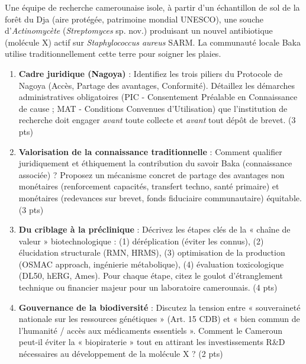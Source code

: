 \documentclass[11pt]{article}
\begin{document}
\begin{exercice}
Une équipe de recherche camerounaise isole, à partir d'un échantillon de sol de la forêt du Dja (aire protégée, patrimoine mondial UNESCO), une souche d'\textit{Actinomycète} (\textit{Streptomyces} sp. nov.) produisant un nouvel antibiotique (molécule X) actif sur \textit{Staphylococcus aureus} SARM. La communauté locale Baka utilise traditionnellement cette terre pour soigner les plaies.

\begin{enumerate}
    \item \textbf{Cadre juridique (Nagoya)} : Identifiez les trois piliers du Protocole de Nagoya (Accès, Partage des avantages, Conformité). Détaillez les démarches administratives obligatoires (PIC - Consentement Préalable en Connaissance de cause ; MAT - Conditions Convenues d'Utilisation) que l'institution de recherche doit engager \textit{avant} toute collecte et \textit{avant} tout dépôt de brevet. (3 pts)
    \item \textbf{Valorisation de la connaissance traditionnelle} : Comment qualifier juridiquement et éthiquement la contribution du savoir Baka (connaissance associée) ? Proposez un mécanisme concret de partage des avantages non monétaires (renforcement capacités, transfert techno, santé primaire) et monétaires (redevances sur brevet, fonds fiduciaire communautaire) équitable. (3 pts)
    \item \textbf{Du criblage à la préclinique} : Décrivez les étapes clés de la « chaîne de valeur » biotechnologique : (1) déréplication (éviter les connus), (2) élucidation structurale (RMN, HRMS), (3) optimisation de la production (OSMAC approach, ingénierie métabolique), (4) évaluation toxicologique (DL50, hERG, Ames). Pour chaque étape, citez le goulot d'étranglement technique ou financier majeur pour un laboratoire camerounais. (4 pts)
    \item \textbf{Gouvernance de la biodiversité} : Discutez la tension entre « souveraineté nationale sur les ressources génétiques » (Art. 15 CDB) et « bien commun de l'humanité / accès aux médicaments essentiels ». Comment le Cameroun peut-il éviter la « biopiraterie » tout en attirant les investissements R\&D nécessaires au développement de la molécule X ? (2 pts)
\end{enumerate}
\end{exercice}
\end{document}
